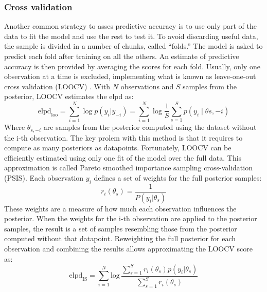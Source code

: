 \subsubsection{Cross validation}
Another common strategy to asses predictive accuracy is to use only part of the data to fit the model and use the rest
to test it. To avoid discarding useful data, the sample is divided in a number of chunks, called “folds.” The
model is asked to predict each fold after training on all the others. An estimate of predictive accuracy is then
provided by averaging the scores for each fold.
Usually, only one observation at a time is excluded, implementing what is known as leave-one-out cross validation (LOOCV)
 \cite{vehtari2017practical}. With
$N$ observations and $S$ samples from the posterior, LOOCV estimates the elpd as:
\begin{equation}
    \mathrm{elpd}_{\mathrm{loo}}=\sum_{i=1}^{N}\log p(y_{i}|y_{-i})=\sum_{i=1}^N \log \frac{1}{S}\sum_{s=1}^S p(y_i\mid \theta{s,-i})
\end{equation}
Where $\theta_{s,-i}$ are samples from the posterior computed using the dataset without the i-th observation.
The key prolem with this method is that it requires to compute as many posteriors as datapoints.
Fortunately, LOOCV can be efficiently estimated using only one fit of the model over the full data. This approximation is
called Pareto smoothed importance sampling cross-validation (PSIS). Each observation $y_i$ defines a set of
weights for the full posterior samples:
\begin{equation}
  r_i(\theta_{s})={\frac{1}{P(y_{i}|\theta_{s})}}
\end{equation}
These weights are a measure of how much each observation influences the posterior. When the weights for the i-th
observation are applied to the posterior samples, the result is a set of samples resembling those from the posterior
computed without that datapoint. Reweighting the full posterior for each observation and combining the results allows
approximating the LOOCV score as:
\begin{equation}
  \mathrm{elpd}_{\mathrm{IS}}=\sum_{i=1}^{N}\mathrm{log}\,\frac{\sum_{s=1}^{S}r_i(\theta_{s})p(y_{i}|\theta_{s})}
  {\sum_{s=1}^{S}r_i(\theta_{s})}
\end{equation}

